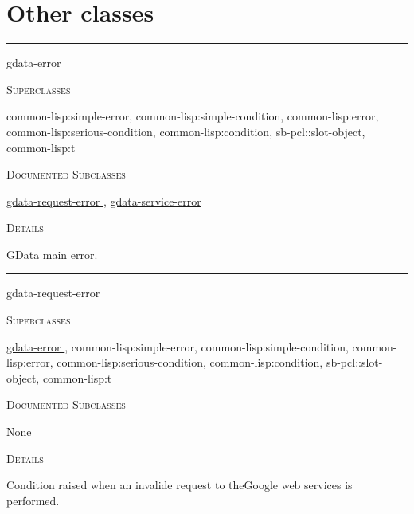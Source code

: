 \documentclass[a4paper]{report}
\begin{document}
  
      \section{Other classes}
      

    \rule{\linewidth}{0.1mm}
    
    \label{cl-gdata-service__class__gdata-error}
    \begin{defun}[Class]
    gdata-error


      
    \bigskip
    \textsc{Superclasses}

\color[rgb]{0.5,0.5,0.5}common-lisp:simple-error\color[rgb]{0,0,0}, \color[rgb]{0.5,0.5,0.5}common-lisp:simple-condition\color[rgb]{0,0,0}, \color[rgb]{0.5,0.5,0.5}common-lisp:error\color[rgb]{0,0,0}, \color[rgb]{0.5,0.5,0.5}common-lisp:serious-condition\color[rgb]{0,0,0}, \color[rgb]{0.5,0.5,0.5}common-lisp:condition\color[rgb]{0,0,0}, \color[rgb]{0.5,0.5,0.5}sb-pcl::slot-object\color[rgb]{0,0,0}, \color[rgb]{0.5,0.5,0.5}common-lisp:t\color[rgb]{0,0,0}


      
    \bigskip
    \textsc{Documented Subclasses}

\hyperref[cl-gdata-service__class__gdata-request-error]{
	  gdata-request-error
	}
      , \hyperref[cl-gdata-service__class__gdata-service-error]{
	  gdata-service-error
	}
      


	
    \bigskip
    \textsc{Details}

GData main error.


    
    \end{defun}
  
  

    \rule{\linewidth}{0.1mm}
    
    \label{cl-gdata-service__class__gdata-request-error}
    \begin{defun}[Class]
    gdata-request-error


      
    \bigskip
    \textsc{Superclasses}

\hyperref[cl-gdata-service__class__gdata-error]{
	  gdata-error
	}
      , \color[rgb]{0.5,0.5,0.5}common-lisp:simple-error\color[rgb]{0,0,0}, \color[rgb]{0.5,0.5,0.5}common-lisp:simple-condition\color[rgb]{0,0,0}, \color[rgb]{0.5,0.5,0.5}common-lisp:error\color[rgb]{0,0,0}, \color[rgb]{0.5,0.5,0.5}common-lisp:serious-condition\color[rgb]{0,0,0}, \color[rgb]{0.5,0.5,0.5}common-lisp:condition\color[rgb]{0,0,0}, \color[rgb]{0.5,0.5,0.5}sb-pcl::slot-object\color[rgb]{0,0,0}, \color[rgb]{0.5,0.5,0.5}common-lisp:t\color[rgb]{0,0,0}


      
    \bigskip
    \textsc{Documented Subclasses}


	    None
	  


	
    \bigskip
    \textsc{Details}

Condition raised when an invalide request to theGoogle web services is performed.


    
    \end{defun}
  
\end{document}
